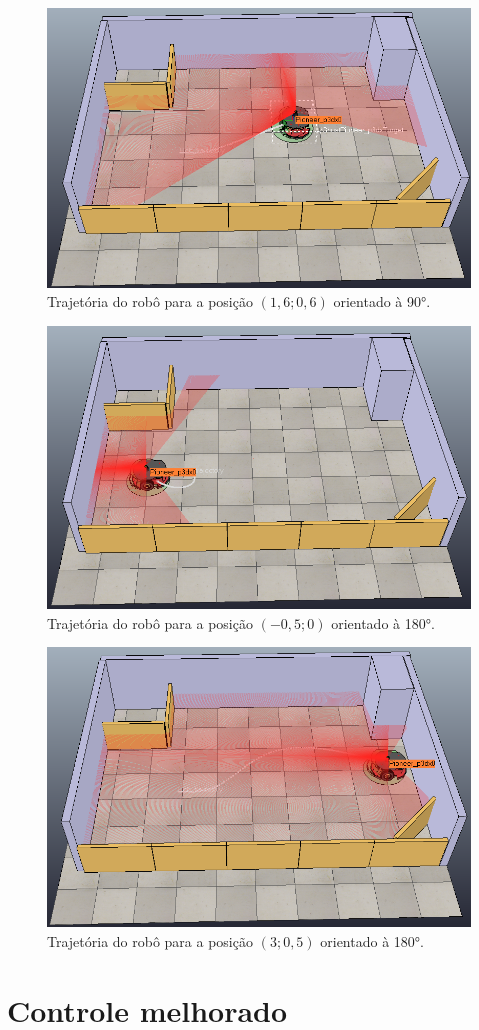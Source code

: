 \begin{figure}[H]
	\centering
	\includegraphics[width=0.6\linewidth]{img/4-1}
	\caption{Trajetória do robô para a posição $(1,6; 0,6)$ orientado à 90°.}
	\label{fig:4-1}
\end{figure}



\begin{figure}[H]
	\centering
	\includegraphics[width=0.6\linewidth]{img/4-2}
	\caption{Trajetória do robô para a posição $(-0,5; 0)$ orientado à 180°.}
	\label{fig:4-2}
\end{figure}


\begin{figure}[H]
	\centering
	\includegraphics[width=0.6\linewidth]{img/4-3}
	\caption{Trajetória do robô para a posição $(3; 0,5)$ orientado à 180°.}
	\label{fig:4-3}
\end{figure}




\section{Controle melhorado}

